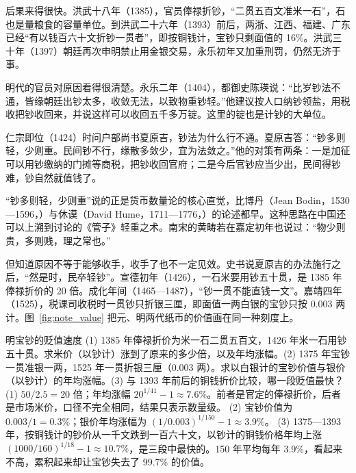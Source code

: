 后果来得很快。洪武十八年（1385），官员俸禄折钞，“二贯五百文准米一石”，石也是量粮食的容量单位。到洪武二十六年（1393）前后，两浙、江西、福建、广东已经“有以钱百六十文折钞一贯者”\cite{mingshi}，即按铜钱计，宝钞只剩面值的 16\%。洪武三十年（1397）朝廷再次申明禁止用金银交易，永乐初年又加重刑罚，仍然无济于事。

明代的官员对原因看得很清楚。永乐二年（1404），都御史陈瑛说：“比岁钞法不通，皆缘朝廷出钞太多，收敛无法，以致物重钞轻。”他建议按人口纳钞领盐，用税收把钞收回来，并说这样可以收回五千多万锭\cite{mingshi}。这里的锭也是计钞的大单位。

仁宗即位（1424）时问户部尚书夏原吉，钞法为什么行不通。夏原吉答：“钞多则轻，少则重。民间钞不行，缘散多敛少，宜为法敛之。”他的对策有两条：一是加征可以用钞缴纳的门摊等商税，把钞收回官府；二是今后官钞应当少出，民间得钞难，钞自然就值钱了\cite{mingshi}。

“钞多则轻，少则重”说的正是货币数量论的核心直觉，比博丹（Jean Bodin，1530—1596，）与休谟（David Hume，1711—1776，）的论述都早。这种思路在中国还可以上溯到讨论的《管子》轻重之术。南宋的黄畴若在嘉定初年也说过：“物少则贵，多则贱，理之常也。”\cite{songshi}

但知道原因不等于能够收手，收手了也不一定见效。史书说夏原吉的办法施行之后，“然是时，民卒轻钞”\cite{mingshi}。宣德初年（1426），一石米要用钞五十贯，是 1385 年俸禄折价的 20 倍。成化年间（1465—1487），“钞一贯不能直钱一文”。嘉靖四年（1525），税课司收税时一贯钞只折银三厘，即面值一两白银的宝钞只按 0.003 两计\cite{mingshi}。图~\ref{fig:note_value} 把元、明两代纸币的价值画在同一种刻度上。


\begin{example}{明宝钞的贬值速度}\label{ex:songming-ming}
(1) 1385 年俸禄折价为米一石二贯五百文，1426 年米一石用钞五十贯。求米价（以钞计）涨到了原来的多少倍，以及年均涨幅。(2) 1375 年宝钞一贯准银一两，1525 年一贯折银三厘（0.003 两）。求以白银计的宝钞价值与银价（以钞计）的年均涨幅。(3) 与 1393 年前后的铜钱折价比较，哪一段贬值最快？
\solution (1) $50/2.5=20$ 倍；年均涨幅 $20^{1/41}-1\approx7.6\%$。前者是官定的俸禄折价，后者是市场米价，口径不完全相同，结果只表示数量级。
(2) 宝钞价值为 $0.003/1=0.3\%$；银价年均涨幅为 $(1/0.003)^{1/150}-1\approx3.9\%$。
(3) 1375—1393 年，按铜钱计的钞价从一千文跌到一百六十文，以钞计的铜钱价格年均上涨 $(1000/160)^{1/18}-1\approx10.7\%$，是三段中最快的。150 年平均每年 3.9\%，看起来不高，累积起来却让宝钞失去了 99.7\% 的价值。
\end{example}

